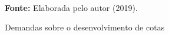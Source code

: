 \begin{figure}[ht!]
\centering

\caption{\textmd{Demandas sobre o desenvolvimento de cotas}}
\label{fig:trello}

\par\medskip\textbf{Fonte:} Elaborada pelo autor (2019). \par\medskip

\end{figure}

